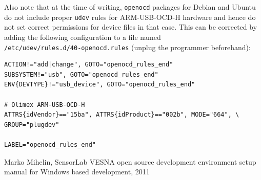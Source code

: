\documentclass[a4paper, 10pt]{article}
\begin{document}
Also note that at the time of writing, \verb|openocd| packages for Debian
and Ubuntu do not include proper \verb|udev| rules for ARM-USB-OCD-H
hardware and hence do not set correct permissions for device files in that
case. This can be corrected by adding the following configuration to a file
named \\ \verb|/etc/udev/rules.d/40-openocd.rules| (unplug the
programmer beforehand):

\begin{verbatim}
ACTION!="add|change", GOTO="openocd_rules_end"
SUBSYSTEM!="usb", GOTO="openocd_rules_end"
ENV{DEVTYPE}!="usb_device", GOTO="openocd_rules_end"

# Olimex ARM-USB-OCD-H
ATTRS{idVendor}=="15ba", ATTRS{idProduct}=="002b", MODE="664", \
GROUP="plugdev"

LABEL="openocd_rules_end"
\end{verbatim}

\begin{thebibliography}{9}
   Marko Mihelin, SensorLab VESNA open source development environment setup manual for Windows based development,
   2011

\end{thebibliography}
\end{document}
